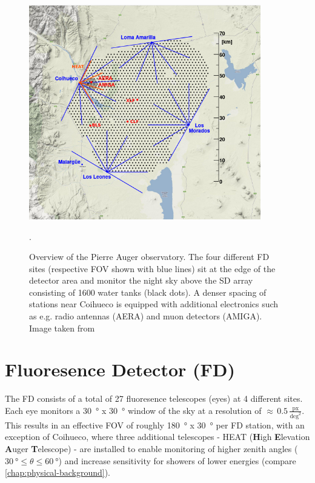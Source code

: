 \begin{figure}
	\centering
	\includegraphics[width=0.9\textwidth]{imgs/auger_array.png}
	\caption{Overview of the Pierre Auger observatory. The four different FD sites (respective FOV shown with blue lines) sit at the edge of
	the detector area and monitor the night sky above the SD array consisting of 1600 water tanks (black dots). A denser spacing of stations 
	near Coihueco is equipped with additional electronics such as e.g. radio antennas (AERA) and muon detectors (AMIGA). Image taken from \cite{AugerArray}}.
	\label{fig:auger-array}
\end{figure}

\section{Fluoresence Detector (FD)}
\label{sec:fluoresence-detector}

The FD consists of a total of 27 fluoresence telescopes (eyes) at 4 different sites. Each eye monitors a \SI{30}{\degree} x \SI{30}{\degree} window 
of the sky at a resolution of $\approx \, 0.5 \, \frac{ \text{px} }{ \text{deg}^2 }$. This results in an effective FOV of roughly \SI{180}{\degree} x 
\SI{30}{\degree} per FD station, with an exception of Coihueco, where three additional telescopes - HEAT (\textbf{H}igh \textbf{E}levation 
\textbf{A}uger \textbf{T}elescope) - are installed to enable monitoring of higher zenith angles ($\SI{30}{\degree}\leq\theta\leq\SI{60}{\degree}$) and
increase sensitivity for showers of lower energies (compare \autoref{chap:physical-background}).

